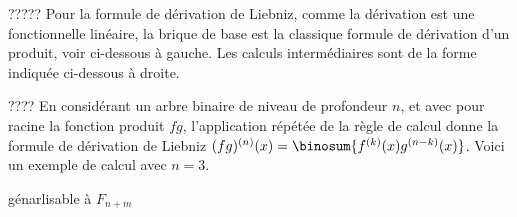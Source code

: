 ?????
Pour la formule de dérivation de Liebniz, comme la dérivation est une fonctionnelle linéaire, la brique de base est la classique formule de dérivation d'un produit, voir ci-dessous à gauche. Les calculs intermédiaires sont de la forme indiquée ci-dessous à droite.

%
            {\intertree}{}


????
En considérant un arbre binaire de niveau de profondeur $n$, et avec pour racine la fonction produit $f g$, l'application répétée de la règle de calcul donne la formule de dérivation de Liebniz 
$(fg)^{(n)}(x) = \binosum{f^{(k)}(x) g^{(n-k)}(x)}$.
%
Voici un exemple de calcul avec $n=3$.



génarlisable à $F_{n+m}$